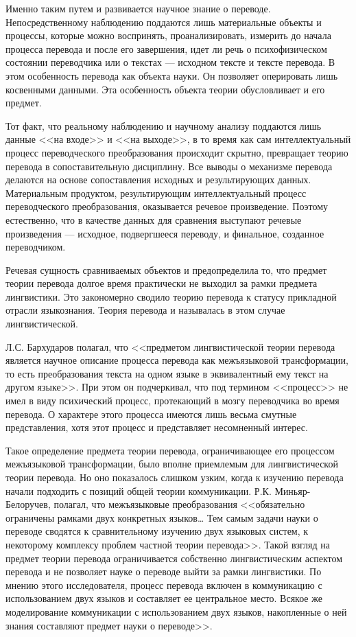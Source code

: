 Именно таким путем и развивается научное знание о переводе. Непосредственному наблюдению поддаются лишь материальные объекты и процессы, которые можно воспринять, проанализировать, измерить до начала процесса перевода и после его завершения, идет ли речь о психофизическом состоянии переводчика или о текстах --- исходном тексте и тексте перевода. В этом особенность перевода как объекта науки. Он позволяет оперировать лишь косвенными данными. Эта особенность объекта теории обусловливает и его предмет.

Тот факт, что реальному наблюдению и научному анализу поддаются лишь данные <<на входе>> и <<на выходе>>, в то время как сам интеллектуальный процесс переводческого преобразования происходит скрытно, превращает теорию перевода в сопоставительную дисциплину. Все выводы о механизме перевода делаются на основе сопоставления исходных и результирующих данных. Материальным продуктом, результирующим интеллектуальный процесс переводческого преобразования, оказывается речевое произведение. Поэтому естественно, что в качестве данных для сравнения выступают речевые произведения --- исходное, подвергшееся переводу, и финальное, созданное переводчиком.

Речевая сущность сравниваемых объектов и предопределила то, что предмет теории перевода долгое время практически не выходил за рамки предмета лингвистики. Это закономерно сводило теорию перевода к статусу прикладной отрасли языкознания. Теория перевода и называлась в этом случае лингвистической.

Л.С. Бархударов полагал, что <<предметом лингвистической теории перевода является научное описание процесса перевода как межъязыковой трансформации, то есть преобразования текста на одном языке в эквивалентный ему текст на другом языке>>. При этом он подчеркивал, что под термином <<процесс>> не имел в виду психический процесс, протекающий в мозгу переводчика во время перевода. О характере этого процесса имеются лишь весьма смутные представления, хотя этот процесс и представляет несомненный интерес.

Такое определение предмета теории перевода, ограничивающее его процессом межъязыковой трансформации, было вполне приемлемым для лингвистической теории перевода. Но оно показалось слишком узким, когда к изучению перевода начали подходить с позиций общей теории коммуникации. Р.К. Миньяр-Белоручев, полагал, что межъязыковые преобразования <<обязательно ограничены рамками двух конкретных языков… Тем самым задачи науки о переводе сводятся к сравнительному изучению двух языковых систем, к некоторому комплексу проблем частной теории перевода>>. Такой взгляд на предмет теории перевода ограничивается собственно лингвистическим аспектом перевода и не позволяет науке о переводе выйти за рамки лингвистики. По мнению этого исследователя, процесс перевода включен в коммуникацию с использованием двух языков и составляет ее центральное место. Всякое же моделирование коммуникации с использованием двух языков, накопленные о ней знания составляют предмет науки о переводе>>.

